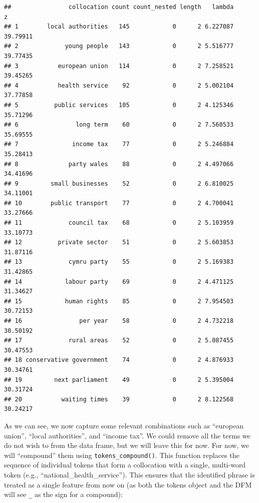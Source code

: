 \documentclass[
]{book}
\newenvironment{Shaded}{\begin{snugshade}}{\end{snugshade}}
\newcommand{\DecValTok}[1]{\textcolor[rgb]{0.00,0.00,0.81}{#1}}
\newcommand{\FunctionTok}[1]{\textcolor[rgb]{0.13,0.29,0.53}{\textbf{#1}}}
\newcommand{\NormalTok}[1]{#1}
\newcommand{\OtherTok}[1]{\textcolor[rgb]{0.56,0.35,0.01}{#1}}
\newcommand{\SpecialCharTok}[1]{\textcolor[rgb]{0.81,0.36,0.00}{\textbf{#1}}}
\begin{document}
\begin{Shaded}
\end{Shaded}

\begin{verbatim}
##                collocation count count_nested length   lambda        z
## 1        local authorities   145            0      2 6.227087 39.79911
## 2             young people   143            0      2 5.516777 39.77435
## 3           european union   114            0      2 7.258521 39.45265
## 4           health service    92            0      2 5.002104 37.77858
## 5          public services   105            0      2 4.125346 35.71296
## 6                long term    60            0      2 7.560533 35.69555
## 7               income tax    77            0      2 5.246884 35.28413
## 8              party wales    88            0      2 4.497066 34.41696
## 9         small businesses    52            0      2 6.810025 34.11001
## 10        public transport    77            0      2 4.700041 33.27666
## 11             council tax    68            0      2 5.103959 33.10773
## 12          private sector    51            0      2 5.603853 31.87116
## 13             cymru party    55            0      2 5.169383 31.42865
## 14            labour party    69            0      2 4.471125 31.34627
## 15            human rights    85            0      2 7.954503 30.72153
## 16                per year    58            0      2 4.732218 30.50192
## 17             rural areas    52            0      2 5.087455 30.47553
## 18 conservative government    74            0      2 4.876933 30.34761
## 19         next parliament    49            0      2 5.395004 30.31724
## 20           waiting times    39            0      2 8.122568 30.24217
\end{verbatim}

As we can see, we now capture some relevant combinations such as ``european union'', ``local authorities'', and ``income tax''. We could remove all the terms we do not wish to from the data frame, but we will leave this for now. For now, we will ``compound'' them using \texttt{tokens\_compound()}. This function replaces the sequence of individual tokens that form a collocation with a single, multi-word token (e.g., ``national\_health\_service''). This ensures that the identified phrase is treated as a single feature from now on (as both the tokens object and the DFM will see \texttt{\_} as the sign for a compound):
\end{document}
